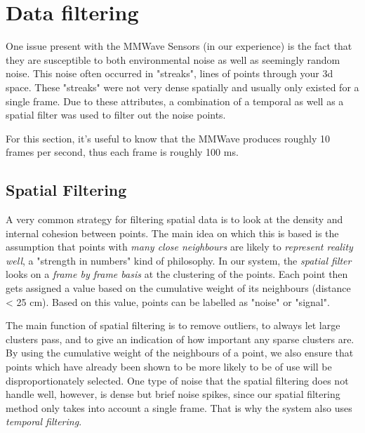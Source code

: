 \section{Data filtering}
\label{section: methodology - data filtering}

One issue present with the MMWave Sensors (in our experience) is the fact that they are susceptible to both environmental noise as well as seemingly random noise. 
This noise often occurred in "streaks", lines of points through your 3d space. 
These "streaks" were not very dense spatially and usually only existed for a single frame.
Due to these attributes, a combination of a temporal as well as a spatial filter was used to filter out the noise points.

For this section, it's useful to know that the MMWave produces roughly 10 frames per second, thus each frame is roughly 100 ms.

\subsection{Spatial Filtering}
\label{sub-section: methodology - data filtering - density filtering}

A very common strategy for filtering spatial data is to look at the density and internal cohesion between points.
The main idea on which this is based is the assumption that points with \textit{many close neighbours} are likely to \textit{represent reality well}, a "strength in numbers" kind of philosophy.
In our system, the \textit{spatial filter} looks on a \textit{frame by frame basis} at the clustering of the points.
Each point then gets assigned a value based on the cumulative weight of its neighbours (distance < 25 cm). 
Based on this value, points can be labelled as "noise" or "signal".

The main function of spatial filtering is to remove outliers, to always let large clusters pass, and to give an indication of how important any sparse clusters are.
By using the cumulative weight of the neighbours of a point, we also ensure that points which have already been shown to be more likely to be of use will be disproportionately selected.
One type of noise that the spatial filtering does not handle well, however, is dense but brief noise spikes, since our spatial filtering method only takes into account a single frame.
That is why the system also uses \textit{temporal filtering}.



